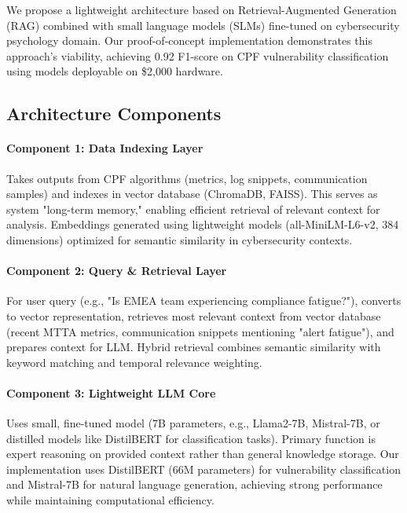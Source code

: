 \documentclass[11pt, a4paper]{article}
\begin{document}
We propose a lightweight architecture based on Retrieval-Augmented Generation (RAG) combined with small language models (SLMs) fine-tuned on cybersecurity psychology domain. Our proof-of-concept implementation\cite{canale2024slm} demonstrates this approach's viability, achieving 0.92 F1-score on CPF vulnerability classification using models deployable on \$2,000 hardware.

\subsection{Architecture Components}

\paragraph{Component 1: Data Indexing Layer}
Takes outputs from CPF algorithms (metrics, log snippets, communication samples) and indexes in vector database (ChromaDB, FAISS). This serves as system "long-term memory," enabling efficient retrieval of relevant context for analysis. Embeddings generated using lightweight models (all-MiniLM-L6-v2, 384 dimensions) optimized for semantic similarity in cybersecurity contexts.

\paragraph{Component 2: Query \& Retrieval Layer}
For user query (e.g., "Is EMEA team experiencing compliance fatigue?"), converts to vector representation, retrieves most relevant context from vector database (recent MTTA metrics, communication snippets mentioning "alert fatigue"), and prepares context for LLM. Hybrid retrieval combines semantic similarity with keyword matching and temporal relevance weighting.

\paragraph{Component 3: Lightweight LLM Core}
Uses small, fine-tuned model (7B parameters, e.g., Llama2-7B, Mistral-7B, or distilled models like DistilBERT for classification tasks). Primary function is expert reasoning on provided context rather than general knowledge storage. Our implementation uses DistilBERT (66M parameters) for vulnerability classification and Mistral-7B for natural language generation, achieving strong performance while maintaining computational efficiency\cite{canale2024slm}.
\end{document}
